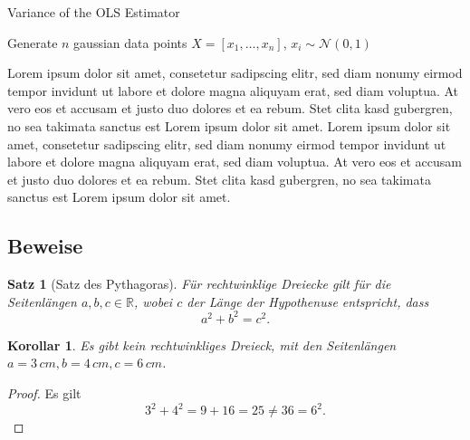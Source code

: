 \documentclass[a4paper,onecolumn]{scrartcl}
\newif\ifdraft\draftfalse
\newcommand{\missing}[1]{\todo[inline]{#1}}
\newcommand{\rtodo}[1]{\todo[backgroundcolor=red]{#1}}
\newcommand{\ytodo}[1]{\todo[backgroundcolor=yellow]{#1}}
\newcommand{\gtodo}[1]{\todo[backgroundcolor=green]{#1}}
\numberwithin{equation}{subsection}
\newcommand{\RR}{\mathbb{R}}
\DeclareMathOperator{\var}{var}
\theoremstyle{plain}
\newtheorem{theorem}{Satz}[subsection]
\newtheorem{corollary}{Korollar}[theorem]
\theoremstyle{remark}
\newcommand{\emptyline}{\vspace{\baselineskip}}
\begin{document}
\begin{algorithm}
    \caption{Variance of the OLS Estimator}
    \emptyline

    Generate $n$ gaussian data points $X = [x_1, \ldots , x_n]$, $x_i \sim \mathcal{N}(0, 1)$ \\
    \Return{$\var(\hat{w})$}
\end{algorithm}

\missing{Test}
\gtodo{Test}
\ytodo{Test}
\rtodo{Test}

Lorem ipsum dolor sit amet, consetetur sadipscing elitr, sed diam nonumy eirmod tempor invidunt ut labore et dolore magna aliquyam erat, sed diam voluptua. At vero eos et accusam et justo duo dolores et ea rebum. Stet clita kasd gubergren, no sea takimata sanctus est Lorem ipsum dolor sit amet. Lorem ipsum dolor sit amet, consetetur sadipscing elitr, sed diam nonumy eirmod tempor invidunt ut labore et dolore magna aliquyam erat, sed diam voluptua. At vero eos et accusam et justo duo dolores et ea rebum. Stet clita kasd gubergren, no sea takimata sanctus est Lorem ipsum dolor sit amet.

\subsection{Beweise}

\begin{theorem}[Satz des Pythagoras]
  Für rechtwinklige Dreiecke gilt für die Seitenlängen $a, b, c\in\RR$, wobei $c$ der Länge der
  Hypothenuse entspricht, dass
  \begin{equation*}
    a^{2} + b^{2} = c^{2}.
  \end{equation*}
\end{theorem}
\begin{corollary}
  Es gibt kein rechtwinkliges Dreieck, mit den Seitenlängen $a=3\,cm, b=4\,cm, c=6\,cm$.
\end{corollary}
\begin{proof}
  Es gilt
  \begin{equation*}
    3^{2} + 4^{2} = 9 + 16 = 25 \neq 36 = 6^{2}.
  \end{equation*}
\end{proof}




\ifdraft\todototoc\listoftodos\fi
\end{document}
